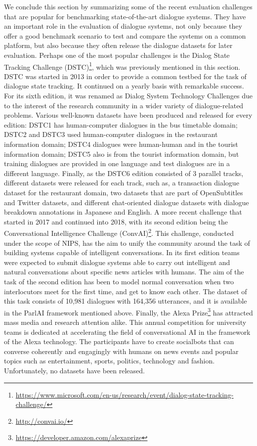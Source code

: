 We conclude this section by summarizing some of the recent evaluation challenges that are popular for benchmarking state-of-the-art dialogue systems. They have an important role in the evaluation of dialogue systems, not only because they offer a good benchmark scenario to test and compare the systems on a common platform, but also because they often release the dialogue datasets for later evaluation.
Perhaps one of the most popular challenges is the Dialog State Tracking Challenge (DSTC)\footnote{\url{https://www.microsoft.com/en-us/research/event/dialog-state-tracking-challenge/}}, which was previously mentioned in this section. DSTC was started in 2013 in order to provide a common testbed for the task of dialogue state tracking. It continued on a yearly basis with remarkable success. For its sixth edition, it was renamed as Dialog System Technology Challenges due to the interest of the research community in a wider variety of dialogue-related problems. Various well-known datasets have been produced and released for every edition: DSTC1 has human-computer dialogues in the bus timetable domain; DSTC2 and DSTC3 used human-computer dialogues in the restaurant information domain; DSTC4 dialogues were human-human and in the tourist information domain; DSTC5 also is from the tourist information domain, but training dialogues are provided in one language and test dialogues are in a different language. Finally, as the DSTC6 edition consisted of 3 parallel tracks, different datasets were released for each track, such as, a transaction dialogue dataset for the restaurant domain, two datasets that are part of OpenSubtitles and Twitter datasets, and different chat-oriented dialogue datasets with dialogue breakdown annotations in Japanese and English.
A more recent challenge that started in 2017 and continued into 2018, with its second edition being the Conversational Intelligence Challenge  (ConvAI)\footnote{\url{http://convai.io/}}. This challenge, conducted under the scope of NIPS, has the aim to unify the community around the task of building systems capable of intelligent conversations. In its first edition teams were expected to submit dialogue systems able to carry out intelligent and natural conversations about specific news articles with humans. The aim of the task of the second edition has been to model normal conversation when two interlocutors  meet for the first time, and get to know each other. The dataset of this task consists of 10,981 dialogues with 164,356 utterances, and it is available in the ParlAI framework mentioned above.
Finally, the Alexa Prize\footnote{\url{https://developer.amazon.com/alexaprize}} has attracted mass media and research attention alike. This annual competition for university teams is dedicated at accelerating the field of conversational AI in the framework of the Alexa technology. The participants have to create socialbots that can converse coherently and engagingly with humans on news events and popular topics such as entertainment, sports, politics, technology and fashion. Unfortunately, no datasets have been released.

